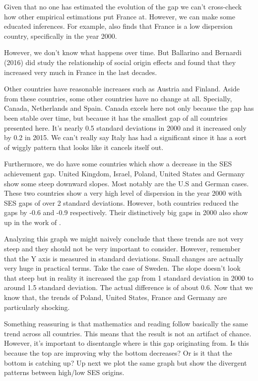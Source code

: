\documentclass[11pt, a4paper]{article}\usepackage[]{graphicx}\usepackage[]{color}
\begin{document}
Given that no one has estimated the evolution of the gap we can't cross-check how other empirical estimations put France at. However, we can make some educated inferences.  For example, \citet{micklewright} also finds that France is a low dispersion country, specifically in the year 2000.

However, we don't know what happens over time. But Ballarino and Bernardi (2016) did study the relationship of social origin effects and found that they increased very much in France in the last decades.

Other countries have reasonable increases such as Austria and Finland. Aside from these countries, some other countries have no change at all. Specially, Canada, Netherlands and Spain. Canada excels here not only because the gap has been stable over time, but because it has the smallest gap of all countries presented here. It's nearly 0.5 standard deviations in 2000 and it increased only by 0.2 in 2015. We can't really say Italy has had a significant since it has a sort of wiggly pattern that looks like it cancels itself out.

Furthermore, we do have some countries which show a decrease in the SES achievement gap. United Kingdom, Israel, Poland, United States and Germany show some steep downward slopes. Most notably are the U.S and German cases. These two countries show a very high level of dispersion in the year 2000 with SES gaps of over 2 standard deviations. However, both countries reduced the gaps by -0.6 and -0.9 respectively. Their distinctively big gaps in 2000 also show up in the work of \citet{micklewright}.

Analyzing this graph we might naively conclude that these trends are not very steep and they should not be very important to consider. However, remember that the Y axis is measured in standard deviations. Small changes are actually very huge in practical terms. Take the case of Sweden. The slope doesn't look that steep but in reality it increased the gap from 1 standard deviation in 2000 to around 1.5 standard deviation. The actual difference is of about 0.6. Now that we know that, the trends of Poland, United States, France and Germany are particularly shocking.

Something reassuring is that mathematics and reading follow basically the same trend across all countries. This means that the result is not an artifact of chance. However, it's important to disentangle where is this gap originating from. Is this because the top are improving why the bottom decreases? Or is it that the bottom is catching up? Up next we plot the same graph but show the divergent patterns between high/low SES origins.
\end{document}
